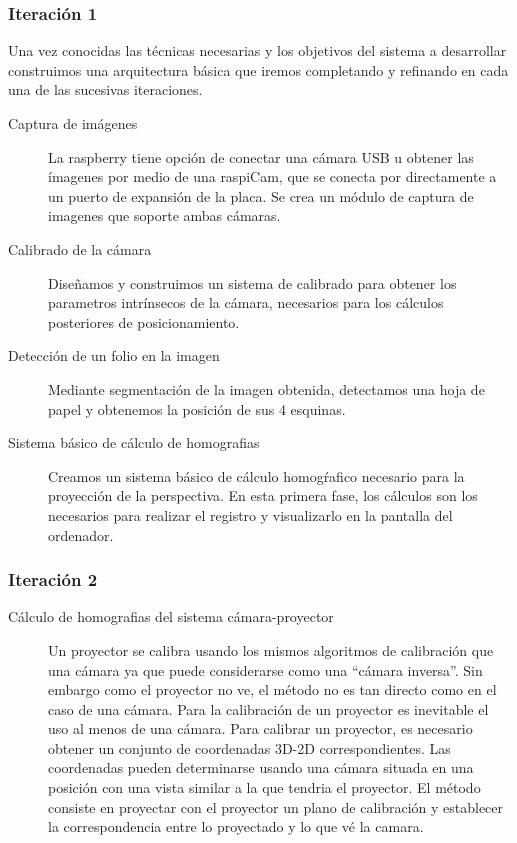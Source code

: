 \subsubsection{Iteración 1}
Una vez conocidas las técnicas necesarias y los objetivos del sistema a desarrollar construimos una arquitectura básica que iremos completando y refinando en cada una de las sucesivas iteraciones.
\begin{description}

\item [Captura de imágenes] La raspberry tiene opción de conectar una cámara USB u obtener las ímagenes por medio de una raspiCam, que se conecta por directamente a un puerto de expansión de la placa. Se crea un módulo de captura de imagenes que soporte ambas cámaras.

\item [Calibrado de la cámara] Diseñamos y construimos un sistema de calibrado para obtener los parametros intrínsecos de la cámara, necesarios para los cálculos posteriores de posicionamiento.

\item [Detección de un folio en la imagen] Mediante segmentación de la imagen obtenida, detectamos una hoja de papel y obtenemos la posición de sus 4 esquinas.

\item [Sistema básico de cálculo de homografias] Creamos un sistema básico de cálculo homogŕafico necesario para la proyección de la perspectiva. En esta primera fase, los cálculos son los
  necesarios para realizar el registro y visualizarlo en la pantalla del ordenador.

\end{description}

\subsubsection{Iteración 2}
\begin{description}
\item [Cálculo de homografias del sistema cámara-proyector] Un proyector se calibra usando los mismos algoritmos de calibración que una cámara ya que puede considerarse como una ``cámara inversa''. Sin embargo como el proyector no ve, el método no es tan directo como en el caso de una cámara.
Para la calibración de un proyector es inevitable el uso al menos de una cámara. Para calibrar un proyector, es necesario obtener un conjunto de coordenadas 3D-2D correspondientes. Las coordenadas pueden determinarse usando una cámara situada en una posición con una vista similar a la que tendria el proyector. El método consiste en proyectar con el proyector un plano de calibración y establecer la correspondencia entre lo proyectado y lo que vé la camara.

\end{description}


